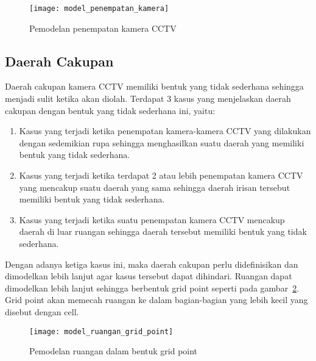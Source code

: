 \begin{figure}[h]
	\centering  
	\texttt{[image: model\_penempatan\_kamera]}
	\caption[Pemodelan penempatan kamera CCTV]{Pemodelan penempatan kamera CCTV} 
	\label{fig:model_penempatan_kamera}
\end{figure}

\subsection{Daerah Cakupan}
Daerah cakupan kamera CCTV memiliki bentuk yang tidak sederhana sehingga menjadi sulit ketika akan diolah. Terdapat 3 kasus yang menjelaskan daerah cakupan dengan bentuk yang tidak sederhana ini, yaitu:
\begin{enumerate}
	\item Kasus yang terjadi ketika penempatan kamera-kamera CCTV yang dilakukan dengan sedemikian rupa sehingga menghasilkan suatu daerah yang memiliki bentuk yang tidak sederhana.
	\item Kasus yang terjadi ketika terdapat 2 atau lebih penempatan kamera CCTV yang mencakup suatu daerah yang sama sehingga daerah irisan tersebut memiliki bentuk yang tidak sederhana.
	\item Kasus yang terjadi ketika suatu penempatan kamera CCTV mencakup daerah di luar ruangan sehingga daerah tersebut memiliki bentuk yang tidak sederhana.
\end{enumerate}
Dengan adanya ketiga kasus ini, maka daerah cakupan perlu didefinisikan dan dimodelkan lebih lanjut agar kasus tersebut dapat dihindari. Ruangan dapat dimodelkan lebih lanjut sehingga berbentuk grid point seperti pada gambar~\ref{fig:model_ruangan_grid_point}. Grid point akan memecah ruangan ke dalam bagian-bagian yang lebih kecil yang disebut dengan cell.

\begin{figure}[h]
	\centering  
	\texttt{[image: model\_ruangan\_grid\_point]}
	\caption[Pemodelan ruangan dalam bentuk grid point]{Pemodelan ruangan dalam bentuk grid point} 
	\label{fig:model_ruangan_grid_point}
\end{figure}

